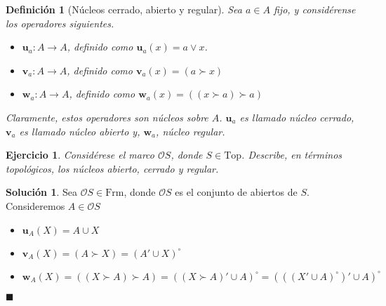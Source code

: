 \documentclass[12pt,letterpaper,titlepage]{article}
\newcommand{\xqed}[1]{%
  \leavevmode\unskip\penalty9999 \hbox{}\nobreak\hfill
  \quad\hbox{\ensuremath{#1}}}
\newtheorem*{defn}{Definición}
\newtheorem{exe}{Ejercicio}
\theoremstyle{definition}
\newtheorem*{soltemp}{Solución}
\newenvironment{sol}[1]{%
    \begin{soltemp}#1}{%
    \xqed{\blacksquare}\end{soltemp}%
}
\renewcommand\sup{\vee}
\renewcommand\cal[1]{\mathcal{#1}}
\newcommand\unuc[1]{\mathbf u_{#1}}
\newcommand\vnuc[1]{\mathbf v_{#1}}
\newcommand\wnuc[1]{\mathbf w_{#1}}
\newcommand\<{\langle}
\renewcommand\>{\rangle}
\newcommand{\Frm}{\mathrm{Frm}}
\newcommand{\Top}{\mathrm{Top}}
\begin{document}
\begin{defn}[Núcleos cerrado, abierto y regular]
Sea $a\in A$ fijo, y considérense los operadores siguientes.
    \begin{itemize}
        \item $\unuc a:A\to A$, definido como $\unuc a(x)= a\sup x$.
        \item $\vnuc a:A\to A$, definido como $\vnuc a(x)=(a\succ x)$
        \item $\wnuc a:A\to A$, definido como
            $\wnuc a(x)=((x\succ a)\succ a)$
    \end{itemize}
Claramente, estos operadores son núcleos sobre $A$.
$\unuc a$ es llamado núcleo cerrado,
$\vnuc a$ es llamado núcleo abierto y, $\wnuc a$, núcleo regular.
\end{defn}
\begin{exe}%
Considérese el marco $\cal O S$, donde $S\in\Top$.
Describe, en términos topológicos, los núcleos abierto, cerrado y regular.
\end{exe}

\begin{sol}
    Sea $\mathcal{O}S\in \Frm$, donde $\mathcal{O}S$ es el conjunto de abiertos de $S$. Consideremos $A\in \mathcal{O}S$
    
    \begin{itemize}
        \item $\unuc A(X)=A\cup X$
        \item $\vnuc A(X)=(A\succ X)=(A'\cup X)^\circ$
        \item
            $\wnuc A(X)
            =((X\succ A)\succ A)
            =((X\succ A)'\cup A)^\circ
            =(((X'\cup A)^\circ)'\cup A)^\circ$
    \end{itemize}
\end{sol}
\end{document}
